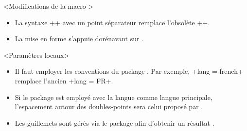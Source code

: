 \begin{bdoctopic}<Modifications de la macro >
    \begin{itemize}
        \item La syntaxe \bdocinlatex++ avec un point séparateur remplace l'obsolète \bdocinlatex++.

        \item La mise en forme s'appuie dorénavant sur .
    \end{itemize}
\end{bdoctopic}




\begin{bdoctopic}<Paramètres locaux>
    \begin{itemize}
        \item Il faut employer les conventions  du package .
        Par exemple, \bdocinlatex+lang = french+ remplace l'ancien \bdocinlatex+lang = FR+.

        \item Si le package  est employé avec la langue  comme langue principale, l'espacement autour des doubles-points sera celui proposé par .

        \item Les guillemets sont gérés via le package  afin d'obtenir un résultat .
    \end{itemize}
\end{bdoctopic}
